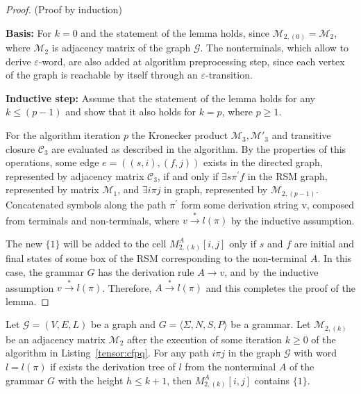 \begin{proof}{(Proof by induction)}

    \textbf{Basis:} For $k = 0$ and the statement of the lemma holds, since
    $\mathcal{M}_{2,(0)} = \mathcal{M}_2$, where $\mathcal{M}_2$ is adjacency matrix of the graph $\mathcal{G}$. The nonterminals,
    which allow to derive $\varepsilon$-word, are also added at algorithm
    preprocessing step, since each vertex of the graph is reachable by itself 
    through an $\varepsilon$-transition.
    
    \textbf{Inductive step:} Assume that the statement of the lemma holds for any
    $k \leq (p - 1)$ and show that it also holds for $k = p$, where $p \geq 1$.
    
    For the algorithm iteration $p$ the Kronecker product $\mathcal{M}_3, \mathcal{M}'_3$ and transitive
    closure $\mathcal{C}_3$ are evaluated as described in the algorithm. By the properties
    of this operations, some edge $e = ((s,i),(f,j))$ exists in the directed
    graph, represented by adjacency matrix $\mathcal{C}_3$, if and only if $\exists s
    \pi ^{'} f$ in the RSM graph, represented by matrix $\mathcal{M}_1$, and 
    $\exists i \pi j$ in graph, represented by $\mathcal{M}_{2,(p-1)}$. Concatenated symbols 
    along the path $\pi^{'}$ form some derivation string v, composed from terminals
    and non-terminals, where $v \xrightarrow{*} l(\pi)$  by the inductive assumption.
    
    The new $\{1\}$ will be added to the cell $M_{2,(k)}^A[i,j]$ only if $s$ and $f$ 
    are initial and final states of some box of the RSM corresponding to 
    the non-terminal $A$. In this case, the grammar $G$ has the derivation rule
    $A \to v$, and by the inductive assumption $v \xrightarrow{*} l(\pi)$. Therefore, 
    $A \xrightarrow{*} l(\pi)$ and this completes the proof of the lemma.
    
\end{proof}

\begin{lemma}
    \label{lemma:algo:completeness}
    Let $\mathcal{G} = (V,E,L)$ be a graph and $G = \langle\Sigma, N, S, P\rangle$ be a grammar. 
    Let $\mathcal{M}_{2,(k)}$ be an adjacency matrix $\mathcal{M}_2$ after the execution of some iteration $k \geq 0$ of the algorithm in Listing~\ref{tensor:cfpq}.
    For any path $i \pi j$ in the graph $\mathcal{G}$ with word $l = l(\pi)$ if 
    exists the derivation tree of $l$ from the nonterminal $A$ of the grammar $G$ with the height $h \leq k+1$, then $M_{2,(k)}^A[i,j]$ contains $\{1\}$.

\end{lemma}


